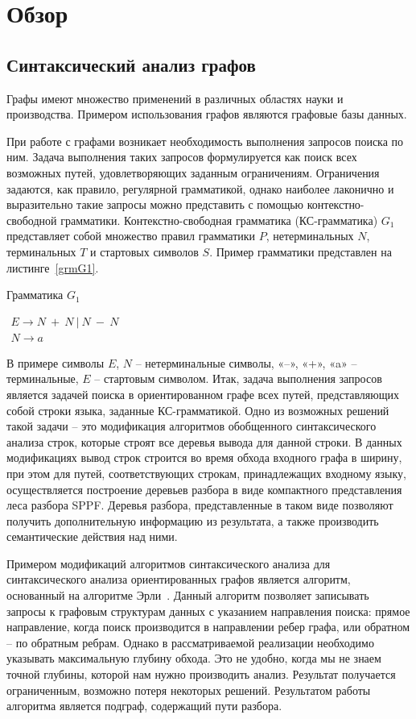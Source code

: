 \section{Обзор}
\subsection{Синтаксический анализ графов}
Графы имеют множество применений в различных областях науки и производства. Примером использования графов являются графовые базы данных.

При работе с графами возникает необходимость выполнения запросов поиска по ним. Задача выполнения таких запросов формулируется как поиск всех возможных путей, удовлетворяющих заданным ограничениям. Ограничения задаются, как правило, регулярной грамматикой, однако наиболее лаконично и выразительно такие запросы можно представить с помощью контекстно-свободной грамматики. Контекстно-свободная грамматика (КС-грамматика) $G_1$ представляет собой множество правил грамматики $P$, нетерминальных $N$, терминальных $T$ и стартовых символов $S$. Пример грамматики представлен на листинге~\ref{grmG1}.

\begin{listing}
\caption{Грамматика $G_1$}
\label{grmG1}
\centering
$\begin{array}{ll}
E \rightarrow N \ + \ N \ | \ N \ - \ N
\\
N \rightarrow a
\end{array}$
 \end{listing}

В примере символы $E$, $N$ – нетерминальные символы, «–», «+», «a» – терминальные, $E$ – стартовым символом. Итак, задача выполнения запросов является задачей поиска в ориентированном графе всех путей, представляющих собой строки языка, заданные КС-грамматикой. Одно из возможных решений такой задачи – это модификация алгоритмов обобщенного синтаксического анализа строк, которые строят все деревья вывода для данной строки. В данных модификациях вывод строк строится во время обхода входного графа в ширину, при этом для путей, соответствующих строкам, принадлежащих входному языку, осуществляется построение деревьев разбора в виде компактного представления леса разбора SPPF. Деревья разбора, представленные в таком виде позволяют получить дополнительную информацию из результата, а также производить семантические действия над ними.

Примером модификаций алгоритмов синтаксического анализа для синтаксического анализа ориентированных графов является алгоритм, основанный на алгоритме Эрли~\cite{Sevon}. Данный алгоритм позволяет записывать запросы к графовым структурам данных с указанием направления поиска: прямое направление, когда поиск производится в направлении ребер графа, или обратном – по обратным ребрам. Однако в рассматриваемой реализации необходимо указывать максимальную глубину обхода. Это не удобно, когда мы не знаем точной глубины, которой нам нужно производить анализ. Результат получается ограниченным, возможно потеря некоторых решений. Результатом работы алгоритма является подграф, содержащий пути разбора. 

